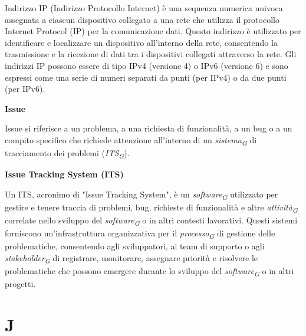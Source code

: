 \documentclass{article}
\begin{document}
\vspace{0.1cm}

Indirizzo IP (Indirizzo Protocollo Internet) è una sequenza numerica univoca assegnata a ciascun dispositivo collegato a una rete che utilizza il protocollo Internet Protocol (IP) per la comunicazione dati. Questo indirizzo è utilizzato per identificare e localizzare un dispositivo all'interno della rete, consentendo la trasmissione e la ricezione di dati tra i dispositivi collegati attraverso la rete. Gli indirizzi IP possono essere di tipo IPv4 (versione 4) o IPv6 (versione 6) e sono espressi come una serie di numeri separati da punti (per IPv4) o da due punti (per IPv6).

\vspace{0.4cm}

\textbf{Issue}

\vspace{0.1cm}

Issue si riferisce a un problema, a una richiesta di funzionalità, a un bug o a un compito specifico che richiede attenzione all'interno di un \textit{sistema}\textsubscript{\textit{G}} di tracciamento dei problemi (\textit{ITS}\textsubscript{\textit{G}}).

\vspace{0.4cm}

\textbf{Issue Tracking System (ITS)}

\vspace{0.1cm}

Un ITS, acronimo di "Issue Tracking System", è un \textit{software}\textsubscript{\textit{G}} utilizzato per gestire e tenere traccia di problemi, bug, richieste di funzionalità e altre \textit{attività}\textsubscript{\textit{G}} correlate nello sviluppo del \textit{software}\textsubscript{\textit{G}} o in altri contesti lavorativi. Questi sistemi forniscono un'infrastruttura organizzativa per il \textit{processo}\textsubscript{\textit{G}} di gestione delle problematiche, consentendo agli sviluppatori, ai team di supporto o agli \textit{stakeholder}\textsubscript{\textit{G}} di registrare, monitorare, assegnare priorità e risolvere le problematiche che possono emergere durante lo sviluppo del \textit{software}\textsubscript{\textit{G}} o in altri progetti.

\pagebreak
\section*{J}
{}
\end{document}
